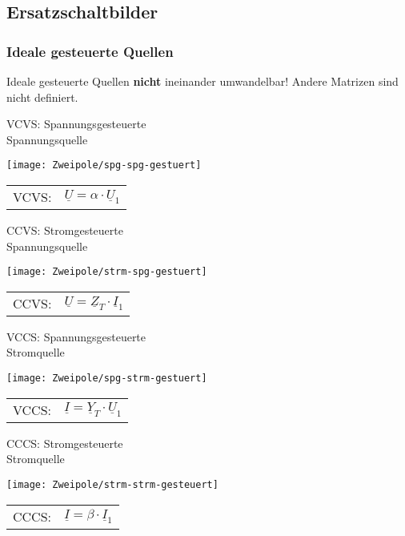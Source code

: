 \subsection{Ersatzschaltbilder}
\subsubsection{Ideale gesteuerte Quellen}
Ideale gesteuerte Quellen \textbf{nicht} ineinander umwandelbar! Andere Matrizen sind nicht definiert.\\
\begin{minipage}[t]{0.5\columnwidth}
\footnotesize
VCVS: Spannungsgesteuerte\\ Spannungsquelle
\normalsize
\begin{center}
	\texttt{[image: Zweipole/spg-spg-gestuert]}\\
	\begin{tabular}{cc}
		VCVS:& $\underline{U}=\alpha\cdot \underline{U}_1$
	\end{tabular}
\end{center}
\end{minipage}
\begin{minipage}[t]{0.5\columnwidth}
 \footnotesize
	CCVS: Stromgesteuerte \\ Spannungsquelle
	\normalsize
	\begin{center}
		\texttt{[image: Zweipole/strm-spg-gestuert]}\\
		\begin{tabular}{cc}
				CCVS: & $\underline{U}=\underline{Z}_T\cdot \underline{I}_1$
		\end{tabular}
	\end{center}
\end{minipage}
\begin{minipage}[t]{0.5\columnwidth}
	\footnotesize
	VCCS: Spannungsgesteuerte\\ Stromquelle
	\normalsize
	\begin{center}
		\texttt{[image: Zweipole/spg-strm-gestuert]}\\
		\begin{tabular}{cc}
			VCCS:& $\underline{I}=\underline{Y}_T\cdot \underline{U}_1$
		\end{tabular}
	\end{center}
\end{minipage}
\begin{minipage}[t]{0.5\columnwidth}
	\footnotesize
	CCCS: Stromgesteuerte\\ Stromquelle
	\normalsize
	\begin{center}
		\texttt{[image: Zweipole/strm-strm-gesteuert]}\\
		\begin{tabular}{cc}
			CCCS:& $\underline{I}=\beta\cdot \underline{I}_1$
		\end{tabular}
	\end{center}
\end{minipage}

